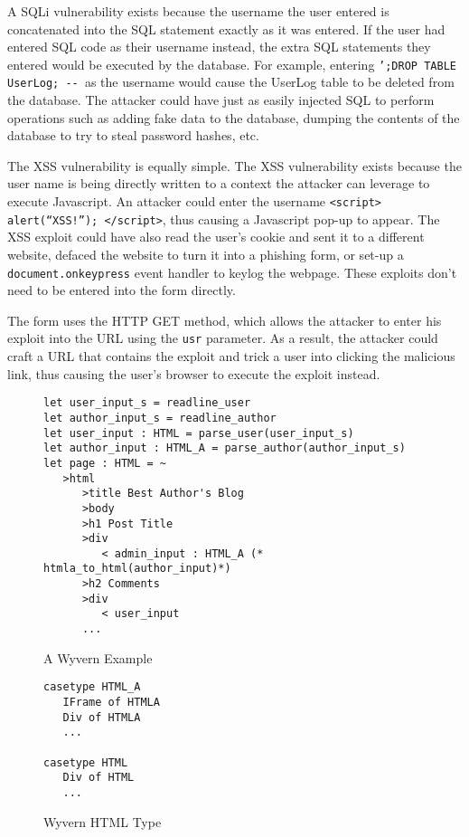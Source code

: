 A SQLi vulnerability exists because the username the user entered
is concatenated into the SQL statement exactly as it was entered.
If the user had entered SQL code as their username instead, the extra
SQL statements they entered would be executed by the database. For
example, entering \texttt{';DROP TABLE UserLog; -{}- }as the username
would cause the UserLog table to be deleted from the database. The
attacker could have just as easily injected SQL to perform operations
such as adding fake data to the database, dumping the contents of
the database to try to steal password hashes, etc. 

The XSS vulnerability is equally simple.
The XSS vulnerability exists because the user name is being directly
written to a context the attacker can leverage to execute Javascript.
An attacker could enter the username \texttt{<script> alert(``XSS!''); </script>},
thus causing a Javascript pop-up to appear. The XSS exploit could
have also read the user's cookie and sent it to a different website,
defaced the website to turn it into a phishing form, or set-up a \texttt{document.onkeypress}
event handler to keylog the webpage. These exploits don't need to
be entered into the form directly.

The form uses the HTTP GET method, which allows the attacker to enter
his exploit into the URL using the \texttt{usr} parameter. As a
result, the attacker could craft a URL that contains the exploit and
trick a user into clicking the malicious link, thus causing the user's
browser to execute the exploit instead.


\begin{figure}
\begin{lstlisting}
let user_input_s = readline_user
let author_input_s = readline_author
let user_input : HTML = parse_user(user_input_s)
let author_input : HTML_A = parse_author(author_input_s)
let page : HTML = ~
   >html
      >title Best Author's Blog
      >body
      >h1 Post Title
      >div
         < admin_input : HTML_A (* htmla_to_html(author_input)*)
      >h2 Comments
      >div
         < user_input
      ... 
\end{lstlisting}
\caption{A Wyvern Example}
\label{fig:wyvern-example}
\end{figure}


\begin{figure}
\begin{lstlisting}
casetype HTML_A
   IFrame of HTMLA
   Div of HTMLA
   ...

casetype HTML
   Div of HTML
   ...
\end{lstlisting}
\caption{Wyvern HTML Type}
\label{fig:wyvern-example}
\end{figure}
